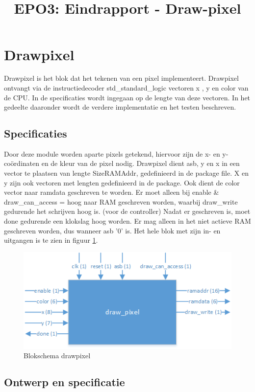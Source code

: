 \documentclass{scrartcl} %
\author{}%
\title{EPO3: Eindrapport - Draw-pixel}
\begin{document}
\section{Drawpixel} %
\label{sec:drawpixel} %

Drawpixel is het blok dat het tekenen van een pixel implementeert. Drawpixel ontvangt via de instructiedecoder std\_standard\_logic vectoren x , y en color van de CPU. In de specificaties wordt ingegaan  op de lengte van deze vectoren. In het gedeelte daaronder wordt de verdere implementatie en het testen beschreven.

\subsection{Specificaties}
\label{ssec:specs_dp}
Door deze module worden aparte pixels getekend, hiervoor zijn de x- en y-coördinaten en de kleur van de pixel nodig. Drawpixel dient asb, y en x in een vector te plaatsen van lengte SizeRAMAddr, gedefinieerd in de package file. X en y zijn ook vectoren met lengten gedefinieerd in de package. Ook dient de color vector naar ramdata geschreven te worden.  Er moet alleen bij enable \& draw\_can\_access = hoog naar RAM geschreven worden, waarbij draw\_write gedurende het schrijven hoog is. (voor de controller)  Nadat er geschreven is, moet done gedurende een klokslag hoog worden. Er mag alleen in het niet actieve RAM geschreven worden, dus wanneer asb '0' is. Het hele blok met zijn in- en uitgangen is te zien in figuur  \ref{fig:dp_blokschema}. 
\begin{figure} [h!]
\centering
\includegraphics [width = \textwidth] {resource/dp_blokschema-rc}
\caption{Blokschema drawpixel}
\label{fig:dp_blokschema}
\end{figure}

\subsection{Ontwerp en specificatie}
\label{ssec:vhdl_dp}
\end{document}
